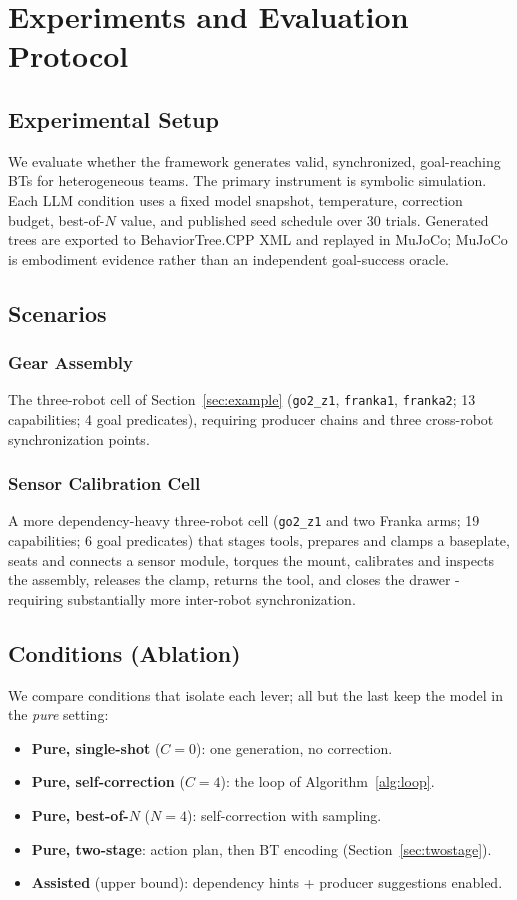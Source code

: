 \documentclass[journal]{IEEEtran}
\begin{document}
\section{Experiments and Evaluation Protocol}

\subsection{Experimental Setup}
We evaluate whether the framework generates valid, synchronized, goal-reaching BTs for heterogeneous teams. The primary instrument is symbolic simulation. Each LLM condition uses a fixed model snapshot, temperature, correction budget, best-of-$N$ value, and published seed schedule over 30 trials. Generated trees are exported to BehaviorTree.CPP XML and replayed in MuJoCo; MuJoCo is embodiment evidence rather than an independent goal-success oracle.

\subsection{Scenarios}
\subsubsection{Gear Assembly}
The three-robot cell of Section~\ref{sec:example} (\texttt{go2\_z1}, \texttt{franka1}, \texttt{franka2}; 13 capabilities; 4 goal predicates), requiring producer chains and three cross-robot synchronization points.

\subsubsection{Sensor Calibration Cell}
A more dependency-heavy three-robot cell (\texttt{go2\_z1} and two Franka arms; 19 capabilities; 6 goal predicates) that stages tools, prepares and clamps a baseplate, seats and connects a sensor module, torques the mount, calibrates and inspects the assembly, releases the clamp, returns the tool, and closes the drawer - requiring substantially more inter-robot synchronization.

\subsection{Conditions (Ablation)}
We compare conditions that isolate each lever; all but the last keep the model in the \emph{pure} setting:
\begin{itemize}
    \item \textbf{Pure, single-shot} ($C=0$): one generation, no correction.
    \item \textbf{Pure, self-correction} ($C\!=\!4$): the loop of Algorithm~\ref{alg:loop}.
    \item \textbf{Pure, best-of-$N$} ($N\!=\!4$): self-correction with sampling.
    \item \textbf{Pure, two-stage}: action plan, then BT encoding (Section~\ref{sec:twostage}).
    \item \textbf{Assisted} (upper bound): dependency hints + producer suggestions enabled.
\end{itemize}
\end{document}
